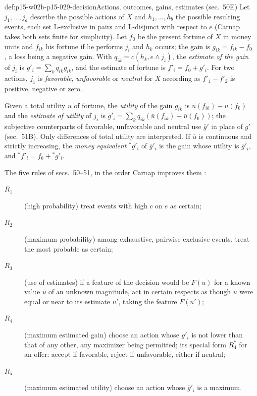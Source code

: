 \begin{hbdefinition}{def:p15-w02b-p15-029-decision}{Actions, outcomes, gains, estimates (sec.~50E)}
Let \(j_1,\ldots,j_a\) describe the possible actions of \(X\) and
\(h_1,\ldots,h_b\) the possible resulting events, each set L-exclusive
in pairs and L-disjunct with respect to \(e\) (Carnap takes both sets
finite for simplicity). Let \(f_0\) be the present fortune of \(X\) in
money units and \(f_{ik}\) his fortune if he performs \(j_i\) and \(h_k\)
occurs; the gain is \(g_{ik}=f_{ik}-f_0\), a loss being a negative
gain. With \(q_{ik}=c(h_k,e\land j_i)\), the \emph{estimate of the gain}
of \(j_i\) is \(g'_i=\sum_kq_{ik}g_{ik}\), and the estimate of fortune
is \(f'_i=f_0+g'_i\). For two actions, \(j_1\) is \emph{favorable},
\emph{unfavorable} or \emph{neutral} for \(X\) according as
\(f'_1-f'_2\) is positive, negative or zero.

Given a total utility \(\bar u\) of fortune, the \emph{utility} of the
gain \(g_{ik}\) is \(\bar u(f_{ik})-\bar u(f_0)\) and the \emph{estimate
of utility} of \(j_i\) is \(\bar g'_i=\sum_kq_{ik}(\bar u(f_{ik})-\bar u(f_0))\);
the subjective counterparts of favorable, unfavorable and neutral use
\(\bar g'\) in place of \(g'\) (sec.~51B). Only differences of total
utility are interpreted. If \(\bar u\) is continuous and strictly
increasing, the \emph{money equivalent} \({}^*g'_i\) of \(\bar g'_i\) is
the gain whose utility is \(\bar g'_i\), and \({}^*f'_i=f_0+{}^*g'_i\).
\end{hbdefinition}

The five rules of secs.~50--51, in the order Carnap improves them
\cite[secs.~50B--51A, pp.~254--270]{Carnap1950Probability}:
\begin{description}
 \item[\(R_1\)] (high probability) treat events with high \(c\) on
   \(e\) as certain;
 \item[\(R_2\)] (maximum probability) among exhaustive, pairwise
   exclusive events, treat the most probable as certain;
 \item[\(R_3\)] (use of estimates) if a feature of the decision would be
   \(F(u)\) for a known value \(u\) of an unknown magnitude, act in
   certain respects as though \(u\) were equal or near to its estimate
   \(u'\), taking the feature \(F(u')\);
 \item[\(R_4\)] (maximum estimated gain) choose an action whose
   \(g'_i\) is not lower than that of any other, any maximizer being
   permitted; its special form \(R_4^*\) for an offer: accept if
   favorable, reject if unfavorable, either if neutral;
 \item[\(R_5\)] (maximum estimated utility) choose an action whose
   \(\bar g'_i\) is a maximum.
\end{description}

